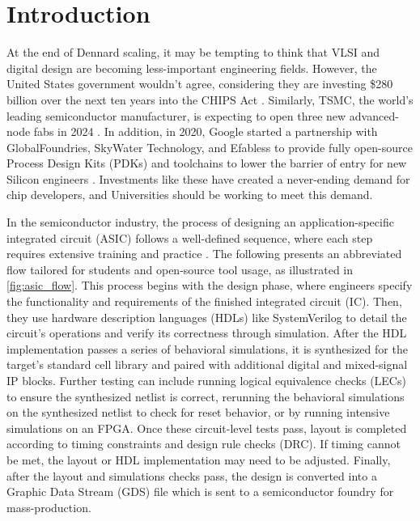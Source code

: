 
\chapter{Introduction}
\label{chapter:introduction}

At the end of Dennard scaling, it may be tempting to think that VLSI and digital design are becoming less-important engineering fields. However, the United States government wouldn't agree, considering they are investing \$280 billion over the next ten years into the CHIPS Act \cite{mckinsey}. Similarly, TSMC, the world's leading semiconductor manufacturer, is expecting to open three new advanced-node fabs in 2024 \cite{taipeitimes}. In addition, in 2020, Google started a partnership with GlobalFoundries, SkyWater Technology, and Efabless to provide fully open-source Process Design Kits (PDKs) and toolchains to lower the barrier of entry for new Silicon engineers \cite{GooglePartnersWithSkyWater, googleSilicon}. Investments like these have created a never-ending demand for chip developers, and Universities should be working to meet this demand.



In the semiconductor industry, the process of designing an application-specific integrated circuit (ASIC) follows a well-defined sequence, where each step requires extensive training and practice \cite{intelDesignFlow, anysiliconDesignFlow, kynixDesignFlow}. The following presents an abbreviated flow tailored for students and open-source tool usage, as illustrated in \autoref{fig:asic_flow}. This process begins with the design phase, where engineers specify the functionality and requirements of the finished integrated circuit (IC). Then, they use hardware description languages (HDLs) like SystemVerilog to detail the circuit's operations and verify its correctness through simulation. After the HDL implementation passes a series of behavioral simulations, it is synthesized for the target's standard cell library and paired with additional digital and mixed-signal IP blocks. Further testing can include running logical equivalence checks (LECs) to ensure the synthesized netlist is correct, rerunning the behavioral simulations on the synthesized netlist to check for reset behavior, or by running intensive simulations on an FPGA. Once these circuit-level tests pass, layout is completed according to timing constraints and design rule checks (DRC). If timing cannot be met, the layout or HDL implementation may need to be adjusted. Finally, after the layout and simulations checks pass, the design is converted into a Graphic Data Stream (GDS) file which is sent to a semiconductor foundry for mass-production.

